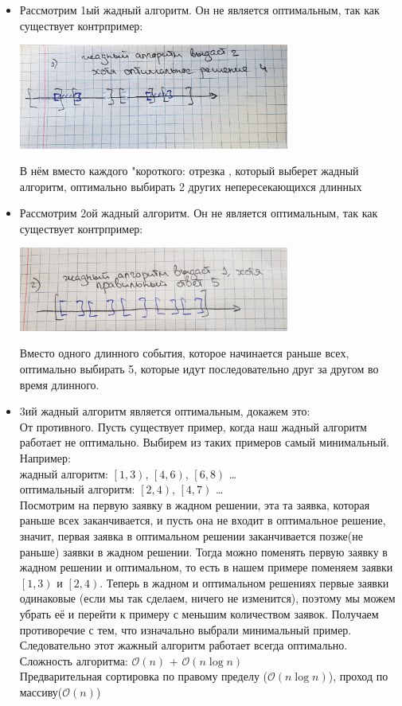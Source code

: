 \documentclass[a4paper,12pt]{article} %
\begin{document}
\begin{itemize}
\item Рассмотрим 1ый жадный алгоритм. Он не является оптимальным, так как существует контрпример:
\begin{center}
\includegraphics[width=0.7\textwidth]{pic_1}
\end{center}
В нём вместо каждого "короткого: отрезка , который выберет жадный алгоритм, оптимально выбирать 2 других непересекающихся длинных 

\item Рассмотрим 2ой жадный алгоритм. Он не является оптимальным, так как существует контрпример:
\begin{center}
\includegraphics[width=0.7\textwidth]{pic_2}
\end{center}
Вместо одного длинного события, которое начинается раньше всех, оптимально выбирать 5, которые идут последовательно друг за другом во время длинного.

\item 3ий жадный алгоритм является оптимальным, докажем это:\\
От противного. Пусть существует пример, когда наш жадный алгоритм работает не оптимально. Выбирем из таких примеров самый минимальный. Например: \\
жадный алгоритм: $\left[ {1,3} \right)$, $\left[ {4,6} \right)$, $\left[ {6,8} \right)$ \ldots \\
оптимальный алгоритм: $\left[ {2,4} \right)$, $\left[ {4,7} \right)$ \ldots \\
Посмотрим на первую заявку в жадном решении, эта та заявка, которая раньше всех заканчивается, и пусть она не входит в оптимальное решение, значит, первая заявка в оптимальном решении заканчивается позже(не раньше) заявки в жадном решении. Тогда можно поменять первую заявку в жадном решении и оптимальном, то есть в нашем примере поменяем заявки $\left[ {1,3} \right)$ и $\left[ {2,4} \right)$. Теперь в жадном и оптимальном решениях первые заявки одинаковые (если мы так сделаем, ничего не изменится), поэтому мы можем убрать её и перейти к примеру с меньшим количеством заявок. Получаем противоречие с тем, что изначально выбрали минимальный пример. Следовательно этот жажный алгоритм работает всегда оптимально.\\
Сложность алгоритма: $\mathcal{O}(n)$ + $\mathcal{O}(n\log{}n)$\\
Предварительная сортировка по правому пределу ($\mathcal{O}(n\log{}n)$), проход по массиву($\mathcal{O}(n)$) 


\end{itemize}
\end{document}
